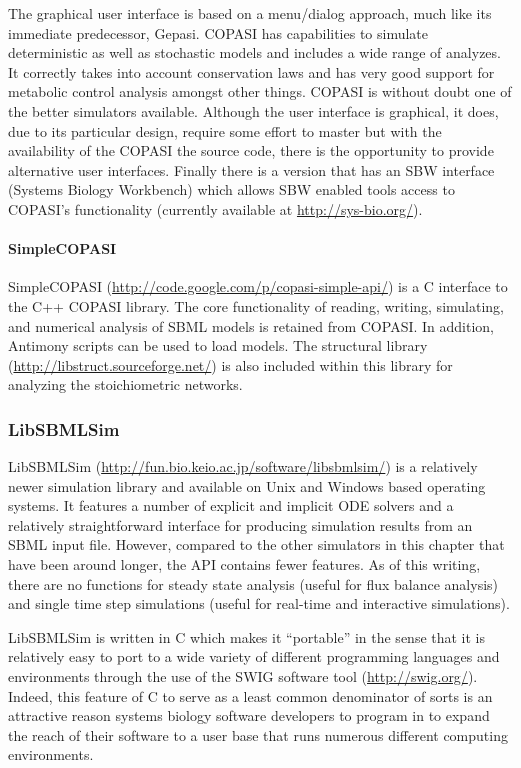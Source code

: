 \documentclass[]{article}
\begin{document}
The graphical user interface is based on a menu/dialog approach, much
like its immediate predecessor, Gepasi. COPASI has capabilities to
simulate deterministic as well as stochastic models and includes a wide
range of analyzes. It correctly takes into account conservation laws and
has very good support for metabolic control analysis amongst other
things. COPASI is without doubt one of the better simulators available.
Although the user interface is graphical, it does, due to its particular
design, require some effort to master but with the availability of the
COPASI the source code, there is the opportunity to provide alternative
user interfaces. Finally there is a version that has an SBW interface
(Systems Biology Workbench) which allows SBW enabled tools access to
COPASI's functionality (currently available at
\url{http://sys-bio.org/}).

\paragraph{SimpleCOPASI}

SimpleCOPASI (\url{http://code.google.com/p/copasi-simple-api/}) is a C
interface to the C++ COPASI library. The core functionality of reading,
writing, simulating, and numerical analysis of SBML models is retained
from COPASI. In addition, Antimony scripts can be used to load models.
The structural library (\url{http://libstruct.sourceforge.net/}) is also
included within this library for analyzing the stoichiometric networks.

\subsubsection{LibSBMLSim}

LibSBMLSim (\url{http://fun.bio.keio.ac.jp/software/libsbmlsim/}) is a
relatively newer simulation library and available on Unix and Windows
based operating systems. It features a number of explicit and implicit
ODE solvers and a relatively straightforward interface for producing
simulation results from an SBML input file. However, compared to the
other simulators in this chapter that have been around longer, the API
contains fewer features. As of this writing, there are no functions for
steady state analysis (useful for flux balance analysis) and single time
step simulations (useful for real-time and interactive simulations).

LibSBMLSim is written in C which makes it ``portable'' in the sense that
it is relatively easy to port to a wide variety of different programming
languages and environments through the use of the SWIG software tool
(\url{http://swig.org/}). Indeed, this feature of C to serve as a least
common denominator of sorts is an attractive reason systems biology
software developers to program in to expand the reach of their software
to a user base that runs numerous different computing environments.
\end{document}
